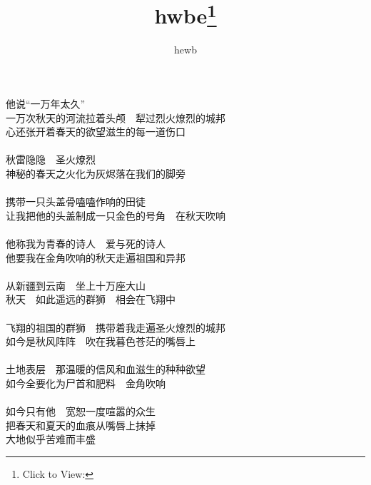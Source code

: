 \documentclass{article}
\title{hwbe\footnote{Click to View:\url{}}}
\author{hewb}
\date{}
\begin{document}

\setlength\parindent{0pt}

\Large

他说“一万年太久”\\

一万次秋天的河流拉着头颅　犁过烈火燎烈的城邦\\
心还张开着春天的欲望滋生的每一道伤口\\
　　\\
秋雷隐隐　圣火燎烈\\
神秘的春天之火化为灰烬落在我们的脚旁\\
　　\\
携带一只头盖骨嗑嗑作响的田徒\\
让我把他的头盖制成一只金色的号角　在秋天吹响\\
　　\\
他称我为青春的诗人　爱与死的诗人\\
他要我在金角吹响的秋天走遍祖国和异邦\\
　　\\
从新疆到云南　坐上十万座大山\\
秋天　如此遥远的群狮　相会在飞翔中\\
　　\\
飞翔的祖国的群狮　携带着我走遍圣火燎烈的城邦\\
如今是秋风阵阵　吹在我暮色苍茫的嘴唇上\\
　　\\
土地表层　那温暖的信风和血滋生的种种欲望\\
如今全要化为尸首和肥料　金角吹响\\
　　\\
如今只有他　宽恕一度喧嚣的众生\\
把春天和夏天的血痕从嘴唇上抹掉\\
大地似乎苦难而丰盛\\
\end{document}
